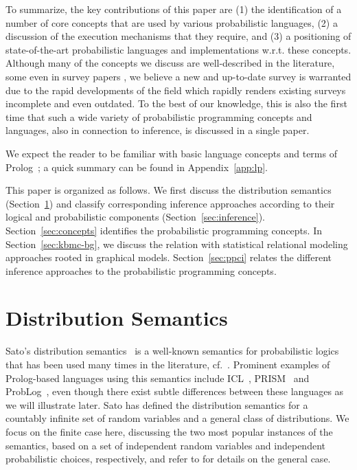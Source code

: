 \documentclass[a4paper]{article}
\begin{document}
To summarize, the key contributions of this paper are (1) 
the identification of a number of core concepts that are used by various probabilistic languages, (2) 
a discussion of the execution mechanisms that they require, 
and (3) a positioning of state-of-the-art probabilistic languages and implementations 
w.r.t. these concepts.  
Although many of the concepts we discuss are well-described in the literature, some even in survey papers \citep{deraedt:sigkdd03,Poole08}, 
we believe a new and up-to-date survey is warranted due to the rapid developments
of the field which rapidly renders existing surveys incomplete and even outdated. 
To the best of our knowledge, this 
is also the first time that such a wide variety of probabilistic programming 
concepts and languages, also in connection to inference, is discussed in a single paper. 



We expect the reader to be familiar with basic language concepts and
terms of Prolog~\citep{lloyd:book89,Fla94:book}; a quick summary can be found
in Appendix~\ref{app:lp}.

This paper is organized as follows. 
We first discuss the distribution semantics (Section~\ref{sec:ds-bg})
and classify corresponding inference approaches according to their
logical and probabilistic components 
(Section~\ref{sec:inference}). Section~\ref{sec:concepts} identifies
the probabilistic programming concepts. In Section~\ref{sec:kbmc-bg}, we
discuss the relation with statistical relational modeling approaches rooted in graphical
models. Section~\ref{sec:ppci} relates the different inference
approaches to the probabilistic programming concepts. 


\section{Distribution Semantics}\label{sec:ds-bg}
Sato's distribution semantics~\citep{Sato:95} is a well-known
semantics for probabilistic logics that has been used many times in
the literature,
cf.~\citep{Dantsin,Poole:93,Fuhr00,Poole00,SatoKameya:01,DalviS04,DeRaedt07-IJCAIa}.
Prominent examples of Prolog-based languages using this semantics
include 
 ICL~\citep{Poole08},
PRISM~\citep{SatoKameya:01} and
ProbLog~\citep{DeRaedt07-IJCAIa,Kimmig11}, even though
there exist subtle differences between these languages as we will
illustrate later.
Sato has defined the distribution
semantics  for a countably infinite set of random variables and a
general class of distributions. We focus on the finite case here,
discussing the two most popular instances of the semantics, based on
a set of independent random variables and independent probabilistic
choices, respectively,  and refer
to \citep{Sato:95} for details on the general case. 
\end{document}
